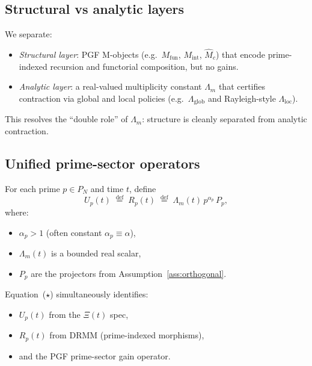 \documentclass[11pt]{article}
\begin{document}
\subsection{Structural vs analytic layers}

We separate:

\begin{itemize}
    \item \emph{Structural layer}: PGF M-objects (e.g.\ $M_{\mathrm{fun}}$,
    $M_{\mathrm{int}}$, $\widehat{M}_c$) that encode prime-indexed recursion
    and functorial composition, but no gains.

    \item \emph{Analytic layer}: a real-valued multiplicity constant $\Lambda_m$
    that certifies contraction via global and local policies (e.g.\ $\Lambda_{\mathrm{glob}}$
    and Rayleigh-style $\Lambda_{\mathrm{loc}}$).
\end{itemize}

This resolves the ``double role'' of $\Lambda_m$: structure is cleanly
separated from analytic contraction.

\subsection{Unified prime-sector operators}

\begin{definition}\label{def:Up}
For each prime $p \in P_N$ and time $t$, define
\begin{equation}
U_p(t) \;\stackrel{\mathrm{def}}{=}\; R_p(t) \;\stackrel{\mathrm{def}}{=}\;
\Lambda_m(t)\, p^{\alpha_p}\, P_p,
\tag{$\star$}
\end{equation}
where:
\begin{itemize}
    \item $\alpha_p > 1$ (often constant $\alpha_p \equiv \alpha$),
    \item $\Lambda_m(t)$ is a bounded real scalar,
    \item $P_p$ are the projectors from Assumption~\ref{ass:orthogonal}.
\end{itemize}
\end{definition}

Equation~($\star$) simultaneously identifies:

\begin{itemize}
    \item $U_p(t)$ from the $\Xi(t)$ spec,
    \item $R_p(t)$ from DRMM (prime-indexed morphisms),
    \item and the PGF prime-sector gain operator.
\end{itemize}
\end{document}
